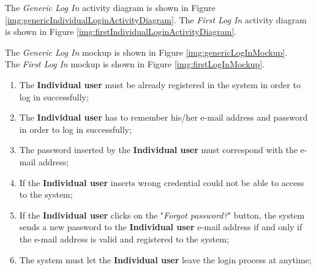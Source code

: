 The \textit{Generic Log In} activity diagram is shown in Figure \ref{img:genericIndividualLoginActivityDiagram}.
The \textit{First Log In} activity diagram is shown in Figure \ref{img:firstIndividualLoginActivityDiagram}.

The \textit{Generic Log In} mockup is shown in Figure \ref{img:genericLogInMockup}. \\
The \textit{First Log In} mockup is shown in Figure \ref{img:firstLogInMockup}.

\begin{enumerate}
  \item The \textbf{Individual user} must be already registered in the system in order to log in successfully;
  \item The \textbf{Individual user} has to remember his/her e-mail address and password in order to log in successfully;
  \item The password inserted by the \textbf{Individual user} must correspond with the e-mail address;
  \item If the \textbf{Individual user} inserts wrong credential could not be able to access to the system;
  \item If the \textbf{Individual user} clicks on the "\textit{Forgot password?}" button, the system sends a new password to the \textbf{Individual user} e-mail address if and only if the e-mail address is valid and registered to the system;
  \item The system must let the \textbf{Individual user} leave the login process at anytime;
\end{enumerate}

